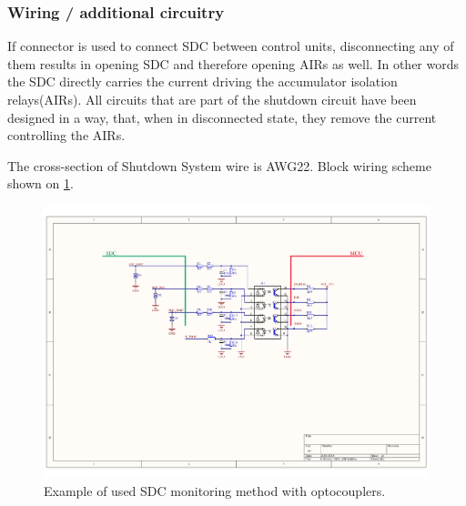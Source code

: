\subsubsection{Wiring / additional circuitry}

If connector is used to connect SDC between control units, disconnecting any of them results in opening SDC and therefore opening AIRs as well. In other words the SDC directly carries the current driving the accumulator isolation relays(AIRs). All circuits that are part of the shutdown circuit have been designed in a way, that, when in disconnected state, they remove the current controlling the AIRs.

The cross-section of Shutdown System wire is AWG22. Block wiring scheme shown on \ref{fig:SDC-schematic}.\\

\begin{figure}[H]
	\centering
	\includegraphics[width=\textwidth,trim={4cm 8cm 5cm 3cm}, clip]{./img/SDC-monitoring.pdf}
	\caption{Example of used SDC monitoring method with optocouplers.}
	\label{fig:SDC-schematic}
\end{figure}

